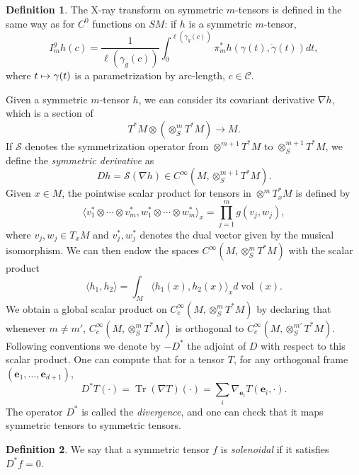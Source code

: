 \documentclass[JEP,XML,SOM,Unicode,NoFloatCountersInSection]{cedram}
\newcommand\mto{\mathchoice{\longmapsto}{\mapsto}{\mapsto}{\mapsto}}
\newcommand{\bse}{\boldsymbol{e}}
\newcommand{\mc}{\mathcal}
\DeclareMathOperator{\vol}{\mathrm{vol}}
\DeclareMathOperator{\Tr}{Tr}
\theoremstyle{plain}
\theoremstyle{definition}
\newtheorem{definition}{Definition}[section]
\begin{document}
\begin{definition}
\label{definition:xray}
The X-ray transform on symmetric $m$-tensors is defined in the same way as for $C^0$ functions on $SM$: if $h$ is a symmetric $m$-tensor,
\[
I_m^g h(c) = \frac{1}{\ell(\gamma_g(c))} \int_{0}^{\ell(\gamma_g(c))} \pi_m^\ast h(\gamma(t),\dot{\gamma}(t)) dt,
\]
where $t \mto \gamma(t)$ is a parametrization by arc-length, $c \in \mc{C}$.
\end{definition}

Given a symmetric $m$-tensor $h$, we can consider its covariant derivative $\nabla h$, which is a section of
\[
T^\ast M \otimes (\otimes^m_S T^\ast M) \to M.
\]
If $\mc{S}$ denotes the symmetrization operator from $\otimes^{m+1} T^\ast M$ to $\otimes^{m+1}_S T^\ast M$, we define the \emph{symmetric derivative} as
\[
D h = \mc{S} (\nabla h) \in C^\infty( M, \otimes^{m+1}_S T^\ast M).
\]
Given $x \in M$, the pointwise scalar product for tensors in $\otimes^m T^\ast_xM$ is defined by
\[
\langle v_1^* \otimes \cdots \otimes v_m^*, w_1^* \otimes \cdots \otimes w_m^* \rangle_x = \prod_{j=1}^m g(v_j,w_j),
\]
where $v_j, w_j \in T_xM$ and $v_j^*,w_j^*$ denotes the dual vector given by the musical isomorphism. We can then endow the spaces $C^\infty(M, \otimes^m_S T^\ast M)$ with the scalar product
\begin{equation}
\label{equation:metric-tensors}
\langle h_1, h_2 \rangle = \int_{M} \langle h_1(x), h_2(x) \rangle_x d\vol(x).
\end{equation}
We obtain a global scalar product on $C^\infty_c(M, \otimes^m_S T^\ast M)$ by declaring that whenever $m\neq m'$, $C^\infty_c(M, \otimes^m_ST^\ast M)$ is orthogonal to $C^\infty_c(M, \otimes^{m'}_ST^\ast M)$. Following conventions we denote by $-D^\ast$ the adjoint of $D$ with respect to this scalar product. One can compute that for a tensor $T$, for any orthogonal frame $(\bse_1,\dots,\bse_{d+1})$,
\[
D^\ast T(\cdot) = \Tr (\nabla T)(\cdot) = \sum_i \nabla_{\bse_i} T(\bse_i, \cdot).
\]
The operator $D^\ast$ is called the \emph{divergence}, and one can check that it maps symmetric tensors to symmetric tensors.

\begin{definition}\label{def:solenoidal}
We say that a symmetric tensor $f$ is \emph{solenoidal} if it satisfies \hbox{$D^*f=0$}.
\end{definition}
\end{document}

